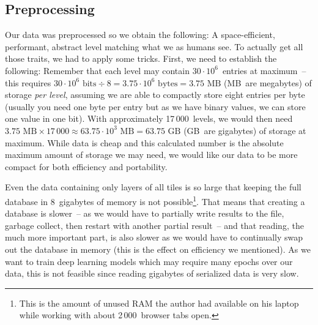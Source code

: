 \subsection{Preprocessing}
\label{sec:preprocessing}

Our data was preprocessed so we obtain the following: A
space-efficient, performant, abstract level matching what we as humans
see. To actually get all those traits, we had to apply some tricks.
First, we need to establish the following: Remember that each level
may contain $30 \cdot 10^{6}$~entries at maximum~-- this requires
$30 \cdot 10^{6}\text{ bits} \div 8 = 3.75 \cdot 10^{6}\text{ bytes} =
3.75\text{ MB}$ (MB~are megabytes) of storage \emph{per level},
assuming we are able to compactly store eight entries per byte
(usually you need one byte per entry but as we have binary values, we
can store one value in one bit). With approximately 17\,000~levels, we
would then need
$3.75\text{ MB} \times 17\,000 \approx 63.75 \cdot 10^{3}\text{ MB} =
63.75\text{ GB}$ (GB~are gigabytes) of storage at maximum. While data
is cheap and this calculated number is the absolute maximum amount of
storage we may need, we would like our data to be more compact for
both efficiency and portability.

Even the data containing only layers of all tiles is so large that
keeping the full database in 8~gigabytes of memory is not
possible\footnote{This is the amount of unused RAM the author had
  available on his laptop while working with about 2\,000~browser tabs
  open.}. That means that creating a database is slower~-- as we would
have to partially write results to the file, garbage collect, then
restart with another partial result~-- and that reading, the much more
important part, is also slower as we would have to continually swap
out the database in memory (this is the effect on efficiency we
mentioned). As we want to train deep learning models which may require
many epochs over our data, this is not feasible since reading
gigabytes of serialized data is very slow.

